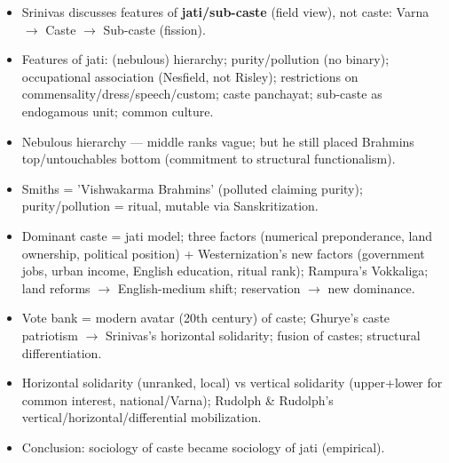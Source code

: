 \begin{QuickRevision}
\begin{itemize}
\item Srinivas discusses features of \textbf{jati/sub-caste} (field view), not caste: Varna $\rightarrow$ Caste $\rightarrow$ Sub-caste (fission).
\item Features of jati: (nebulous) hierarchy; purity/pollution (no binary); occupational association (Nesfield, not Risley); restrictions on commensality/dress/speech/custom; caste panchayat; sub-caste as endogamous unit; common culture.
\item Nebulous hierarchy --- middle ranks vague; but he still placed Brahmins top/untouchables bottom (commitment to structural functionalism).
\item Smiths = 'Vishwakarma Brahmins' (polluted claiming purity); purity/pollution = ritual, mutable via Sanskritization.
\item Dominant caste = jati model; three factors (numerical preponderance, land ownership, political position) + Westernization's new factors (government jobs, urban income, English education, ritual rank); Rampura's Vokkaliga; land reforms $\rightarrow$ English-medium shift; reservation $\rightarrow$ new dominance.
\item Vote bank = modern avatar (20th century) of caste; Ghurye's caste patriotism $\rightarrow$ Srinivas's horizontal solidarity; fusion of castes; structural differentiation.
\item Horizontal solidarity (unranked, local) vs vertical solidarity (upper+lower for common interest, national/Varna); Rudolph \& Rudolph's vertical/horizontal/differential mobilization.
\item Conclusion: sociology of caste became sociology of jati (empirical).
\end{itemize}
\end{QuickRevision}

